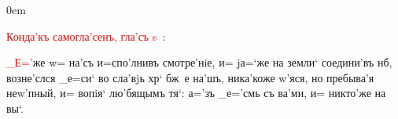 \documentclass{article}
\begin{document}
\parindent 0em           %
\parskip\baselineskip    %

\textcolor{red}{Конда'къ самогла'сенъ, гла'съ s~:}

\textcolor{red}{_Е='}же w= на'съ и=спо'лнивъ смотре'нiе, и= jа=`же на
земли` соедини'въ нб, возне'слся _е=си` во сла'вjь хр` бж~е
на'шъ, ника'коже w'яся, но пребыва'я неw'пный, и= вопiя`
лю'бящымъ тя`: а='зъ _е='смь съ ва'ми, и= никто'же на вы`.
\end{document}
